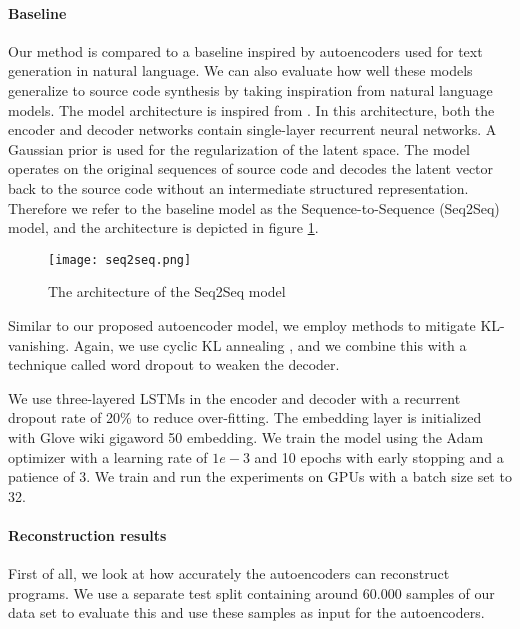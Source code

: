 \paragraph{Baseline}
Our method is compared to a baseline inspired by autoencoders used for text generation in natural language. We can also evaluate how well these models generalize to source code synthesis by taking inspiration from natural language models. The model architecture is inspired from \cite{bowman2015generating}. In this architecture, both the encoder and decoder networks contain single-layer recurrent neural networks. A Gaussian prior is used for the regularization of the latent space. The model operates on the original sequences of source code and decodes the latent vector back to the source code without an intermediate structured representation. Therefore we refer to the baseline model as the Sequence-to-Sequence (Seq2Seq) model, and the architecture is depicted in figure \ref{fig:seq2seq}.

\begin{figure}[ht!]
    \centering
    \texttt{[image: seq2seq.png]}
    \caption{The architecture of the Seq2Seq model}
    \label{fig:seq2seq}
\end{figure}

Similar to our proposed autoencoder model, we employ methods to mitigate KL-vanishing. Again, we use cyclic KL annealing \cite{fu2019cyclical}, and we combine this with a technique called word dropout \cite{bowman2015generating} to weaken the decoder.

We use three-layered LSTMs in the encoder and decoder with a recurrent dropout rate of 20\% to reduce over-fitting. The embedding layer is initialized with Glove wiki gigaword 50 \cite{pennington2014glove} embedding. We train the model using the Adam optimizer \cite{kingma2014adam} with a learning rate of $1e-3$ and 10 epochs with early stopping and a patience of 3. We train and run the experiments on GPUs with a batch size set to 32.

\paragraph{Reconstruction results}\label{sec:recon-results}
First of all, we look at how accurately the autoencoders can reconstruct programs. We use a separate test split containing around 60.000 samples of our data set to evaluate this and use these samples as input for the autoencoders. 



